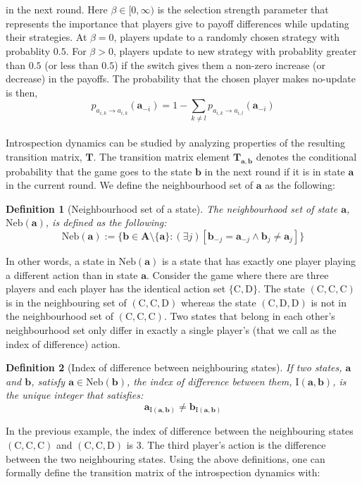 \documentclass[11pt]{article}
\theoremstyle{plainCl1}
\newtheorem{definition}{Definition}
\theoremstyle{plainCl2}
\newcommand{\A}{\mathbf{A}}
\newcommand{\abf}{\mathbf{a}}
\newcommand{\bbf}{\mathbf{b}}
\newcommand{\T}{\mathbf{T}}
\newcommand{\C}{\mathrm{C}}
\newcommand{\D}{\mathrm{D}}
\begin{document}
\\ \\ \noindent in the next round. Here $\beta \in [0,\infty)$ is the selection strength parameter that represents the importance that players give to payoff differences while updating their strategies. At $\beta = 0$, players update to a randomly chosen strategy with probablity $0.5$. For $\beta > 0$, players update to new strategy with probablity greater than $0.5$ (or less than $0.5$) if the switch gives them a non-zero increase (or decrease) in the payoffs. The probability that the chosen player makes no-update is then, \\
\begin{equation}
 p_{a_{i,k} \to a_{i,k}} (\abf_{-i}) = 1 - \sum_{k \neq l} p_{a_{i,k} \to a_{i,l}} (\abf_{-i})
 \label{Eq:introspection-normalization}
\end{equation}
\\ 
Introspection dynamics can be studied by analyzing properties of the resulting transition matrix, $\T$. The transition matrix element $\T_{\abf,\bbf}$ denotes the conditional probability that the game goes to the state $\bbf$ in the next round if it is in state $\abf$ in the current round. We define the neighbourhood set of $\abf$ as the following:
\newpage
\begin{definition}[Neighbourhood set of a state] The neighbourhood set of state $\abf$, $\mathrm{Neb}(\abf)$, is defined as the following:
\begin{equation}
\mathrm{Neb}(\abf) := \{\bbf \in \A \setminus \{ \abf \}  : (\exists j) [ \bbf_{-j} = \abf_{-j} \land  \bbf_{j} \neq \abf_{j}] \}
\label{Eq:neighbourhood-states}
\end{equation} 
\label{Def:neighbourhood-states}
\end{definition} 
\noindent In other words, a state in $\mathrm{Neb}(\abf)$ is a state that has exactly one player playing a different action than in state $\abf$. Consider the game where there are  three players and each player has the identical action set $\{\C, \D \}$.  The state $(\C,\C,\C)$ is in the neighbouring set of $(\C,\C,\D)$ whereas the state $(\C,\D,\D)$ is not in the neighbourhood set of $(\C,\C, \C)$. Two states that belong in each other's neighbourhood set only differ in exactly a single player's (that we call as the index of difference) action. 

\begin{definition} [Index of difference between neighbouring states] If two states, $\abf$ and $\bbf$, satisfy $\abf \in \mathrm{Neb}(\bbf)$, the index of difference between them, $\mathrm{I}(\abf, \bbf)$, is the unique integer that satisfies:
\begin{equation}
\abf_{\mathrm{I}(\abf, \bbf)} \neq \bbf_{\mathrm{I}(\abf, \bbf)}
\end{equation} 
\label{Def:index-of-difference}
\end{definition} 
\noindent In the previous example, the index of difference between the neighbouring states $(\C,\C,\C)$ and $(\C,\C,\D)$ is $3$. The third player's action is the difference between the two neighbouring states. Using the above definitions, one can formally define the transition matrix of the introspection dynamics with:
\end{document}
